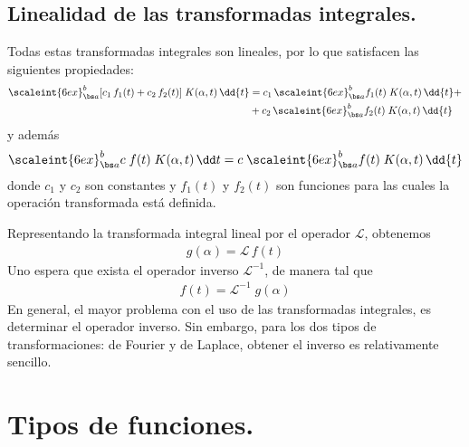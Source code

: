 \subsection{Linealidad de las transformadas integrales.}

Todas estas transformadas integrales son lineales, por lo que satisfacen las siguientes propiedades:
\begin{align}
\begin{aligned}
\scaleint{6ex}_{\bs a}^{b} [ c_{1} \, f_{1} (t) + c_{2} \, f_{2}(t)] \; K(\alpha, t) \, \dd{t} &= c_{1} \, \scaleint{6ex}_{\bs a}^{b} f_{1} (t) \; K(\alpha, t) \, \dd{t} + \\
&+ c_{2} \, \scaleint{6ex}_{\bs a}^{b} f_{2} (t) \; K(\alpha, t) \, \dd{t}
\end{aligned}
\label{eq:ecuacion_15_08} 
\end{align}
y además
\begin{align}
\scaleint{6ex}_{\bs a}^{b}  c \; f (t) \; K(\alpha, t) \, \dd t =  c \; \scaleint{6ex}_{\bs a}^{b} f (t) \; K(\alpha, t) \, \dd{t}
\label{eq:ecuacion_15_09}
\end{align}
donde $c_{1}$ y $c_{2}$ son constantes y $f_{1}(t)$ y $f_{2}(t)$ son funciones para las cuales la operación transformada está definida.
\par
Representando la transformada integral lineal por el operador $\mathcal{L}$, obtenemos
\begin{align}
g (\alpha) = \mathcal{L} \, f(t)
\label{eq:ecuacion_15_10}
\end{align}
Uno espera que exista el operador inverso $\mathcal{L}^{-1}$, de manera tal que
\begin{align}
f(t) = \mathcal{L}^{-1}  \; g (\alpha)
\label{eq:ecuacion_15_11}
\end{align}
En general, el mayor problema con el uso de las transformadas integrales, es determinar el operador inverso. Sin embargo, para los dos tipos de transformaciones: de Fourier y de Laplace, obtener el inverso es relativamente sencillo.

\section{Tipos de funciones.}

